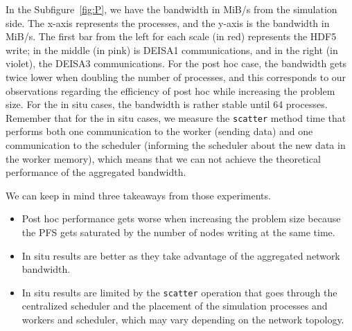 In the Subfigure~\ref{fig:P}, we have the bandwidth in MiB/s from the simulation side.
The x-axis represents the processes, and the y-axis is the bandwidth in MiB/s.
The first bar from the left for each scale (in red) represents the HDF5 write; in the middle (in pink) is DEISA1 communications, and in the right (in violet), the DEISA3 communications.  
For the post hoc case, the bandwidth gets twice lower when doubling the number of processes, and this corresponds to our observations regarding the efficiency of post hoc while increasing the problem size.  
For the in situ cases, the bandwidth is rather stable until 64 processes. %
Remember that for the in situ cases, we measure the \texttt{scatter} method time that performs both one communication to the worker (sending data) and one communication to the scheduler (informing the scheduler about the new data in the worker memory), which means that we can not achieve the theoretical performance of the aggregated bandwidth.

 We can keep in mind three takeaways from those experiments. 
 \begin{itemize}
     \item Post hoc performance gets worse when increasing the problem size because the PFS gets saturated by the number of nodes writing at the same time.
     \item In situ results are better as they take advantage of the aggregated network bandwidth.
     \item In situ results are limited by the \texttt{scatter} operation that goes through the centralized scheduler and the placement of the simulation processes and workers and scheduler, which may vary depending on the network topology. 
 \end{itemize}


